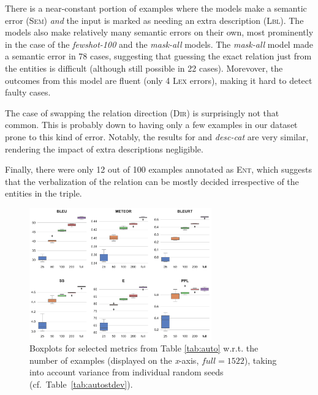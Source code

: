 There is a near-constant portion of examples where the models make a semantic error (\textsc{Sem}) \textit{and} the input is marked as needing an extra description (\textsc{Lbl}). The models also make relatively many semantic errors on their own, most prominently in the case of the \textit{fewshot-100} and the \textit{mask-all} models. The \textit{mask-all} model made a semantic error in 78 cases, suggesting that guessing the exact relation just from the entities is difficult (although still possible in 22 cases). Morevover, the outcomes from this model are fluent (only 4 \textsc{Lex} errors), making it hard to detect faulty cases.


The case of swapping the relation direction (\textsc{Dir}) is surprisingly not that common. This is probably down to having only a few examples in our dataset prone to this kind of error.
Notably, the results for \BARTr{} and \textit{desc-cat} are very similar, rendering the impact of extra descriptions negligible.

Finally, there were only 12 out of 100 examples annotated as \textsc{Ent}, which suggests that the verbalization of the relation can be mostly decided irrespective of the entities in the triple.


\begin{figure}[t]
    \centering
    \includegraphics[width=0.7\textwidth]{img/rel2text-fewshot.pdf}
    \caption{Boxplots for selected metrics from Table \ref{tab:auto} w.r.t. the number of examples (displayed on the \textit{x}-axis, $\textit{full} = 1522$), taking into account variance from individual random seeds (cf.\ Table~\ref{tab:autostdev}).}\label{fig:fewshot}
\end{figure}


